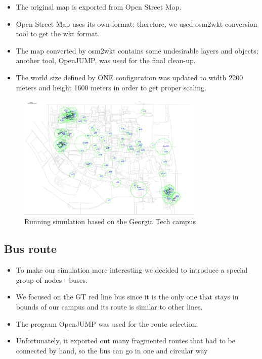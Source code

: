 \documentclass[conference]{IEEEtran}
\begin{document}
\begin{itemize}
  \item The original map is exported from Open Street Map.
  \item Open Street Map uses its own format; therefore, we used osm2wkt conversion tool to get the wkt format.
  \item The map converted by osm2wkt contains some undesirable layers and objects; another tool, OpenJUMP, was used for the final clean-up.
  \item The world size defined by ONE configuration was updated to width 2200 meters and height 1600 meters in order to get proper scaling.
\end{itemize}

\begin{figure}[!t]
\centering
\includegraphics[width=3.5in]{simulation.png}
\caption{Running simulation based on the Georgia Tech campus}
\label{fig_simulation}
\end{figure}

\subsection{Bus route}

\begin{itemize}
  \item To make our simulation more interesting we decided to introduce a special group of nodes - buses.
  \item We focused on the GT red line bus since it is the only one that stays in bounds of our campus and its route is similar to other lines.
  \item The program OpenJUMP was used for the route selection.
  \item Unfortunately, it exported out many fragmented routes that had to be connected by hand, so the bus can go in one and circular way
\end{itemize}
\end{document}
